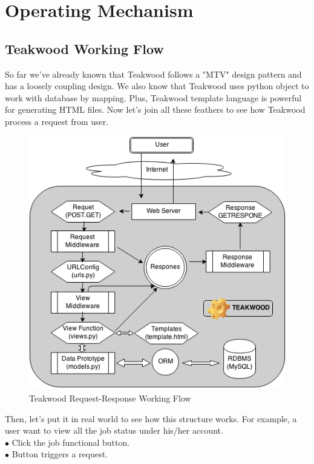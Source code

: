 \chapter{Operating Mechanism}
\section{Teakwood Working Flow}
So far we've already known that Teakwood follows a "MTV" design pattern and has a loosely coupling design. We also know that Teakwood uses python object to work with database by mapping. Plus, Teakwood template language is powerful for generating HTML files. Now let's join all these feathers to see how Teakwood process a request from user. \\

\begin{figure}[h]
\centering
\includegraphics[scale=0.5]{./http_request_response}
\caption{Teakwood Request-Response Working Flow}
\label{fig:label} %
\end{figure}
Then, let's put it in real world to see how this structure works. For example, a user want to view all the job status under his/her account.\\
$\bullet$ Click the job functional button.\\
$\bullet$ Button triggers a request.\\
